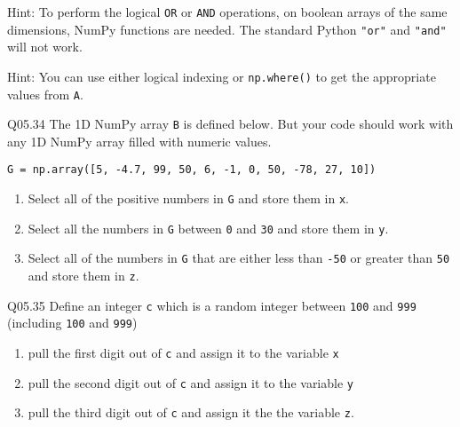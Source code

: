 \documentclass{book}
\newcommand{\passthrough}[1]{#1}
\begin{document}
Hint: To perform the logical \passthrough{\lstinline!OR!} or
\passthrough{\lstinline!AND!} operations, on boolean arrays of the same
dimensions, NumPy functions are needed. The standard Python
\passthrough{\lstinline!"or"!} and \passthrough{\lstinline!"and"!} will
not work.

Hint: You can use either logical indexing or
\passthrough{\lstinline!np.where()!} to get the appropriate values from
\passthrough{\lstinline!A!}.

Q05.34 The 1D NumPy array \passthrough{\lstinline!B!} is defined below.
But your code should work with any 1D NumPy array filled with numeric
values.

\passthrough{\lstinline!G = np.array([5, -4.7, 99, 50, 6, -1, 0, 50, -78, 27, 10])!}

\begin{enumerate}
\def\labelenumi{(\alph{enumi})}
\item
  Select all of the positive numbers in \passthrough{\lstinline!G!} and
  store them in \passthrough{\lstinline!x!}.
\item
  Select all the numbers in \passthrough{\lstinline!G!} between
  \passthrough{\lstinline!0!} and \passthrough{\lstinline!30!} and store
  them in \passthrough{\lstinline!y!}.
\item
  Select all of the numbers in \passthrough{\lstinline!G!} that are
  either less than \passthrough{\lstinline!-50!} or greater than
  \passthrough{\lstinline!50!} and store them in
  \passthrough{\lstinline!z!}.
\end{enumerate}

Q05.35 Define an integer \passthrough{\lstinline!c!} which is a random
integer between \passthrough{\lstinline!100!} and
\passthrough{\lstinline!999!} (including \passthrough{\lstinline!100!}
and \passthrough{\lstinline!999!})

\begin{enumerate}
\def\labelenumi{(\alph{enumi})}
\item
  pull the first digit out of \passthrough{\lstinline!c!} and assign it
  to the variable \passthrough{\lstinline!x!}
\item
  pull the second digit out of \passthrough{\lstinline!c!} and assign it
  to the variable \passthrough{\lstinline!y!}
\item
  pull the third digit out of \passthrough{\lstinline!c!} and assign it
  the the variable \passthrough{\lstinline!z!}.
\end{enumerate}
    
\end{document}
